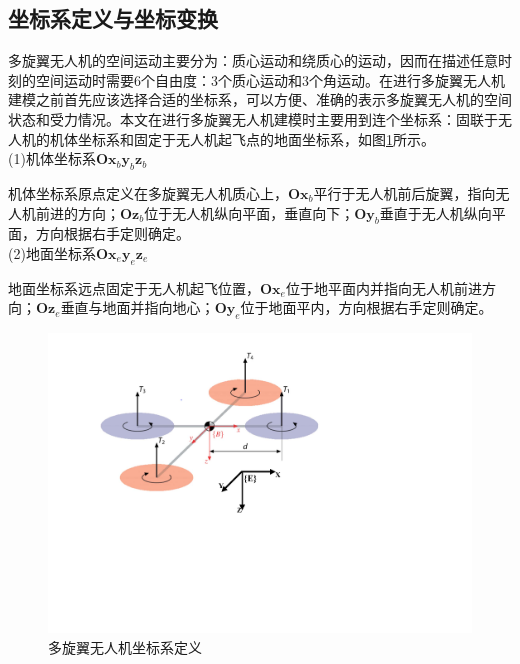 \subsection{坐标系定义与坐标变换}
多旋翼无人机的空间运动主要分为：质心运动和绕质心的运动，因而在描述任意时刻的空间运动时需要6个自由度：3个质心运动和3个角运动。在进行多旋翼无人机建模之前首先应该选择合适的坐标系，可以方便、准确的表示多旋翼无人机的空间状态和受力情况。本文在进行多旋翼无人机建模时主要用到连个坐标系：固联于无人机的机体坐标系和固定于无人机起飞点的地面坐标系，如图\ref{fig2.2}所示。\\
(1)机体坐标系$\boldsymbol{O} \boldsymbol{x}_b \boldsymbol{y}_b \boldsymbol{z}_b$

机体坐标系原点定义在多旋翼无人机质心上，$\boldsymbol{O} \boldsymbol{x}_b$平行于无人机前后旋翼，指向无人机前进的方向；$\boldsymbol{O} \boldsymbol{z}_b$位于无人机纵向平面，垂直向下；$\boldsymbol{O} \boldsymbol{y}_b$垂直于无人机纵向平面，方向根据右手定则确定。 \\ 
(2)地面坐标系$\boldsymbol{O} \boldsymbol{x}_e \boldsymbol{y}_e \boldsymbol{z}_e$

地面坐标系远点固定于无人机起飞位置，$\boldsymbol{O} \boldsymbol{x}_e$位于地平面内并指向无人机前进方向；$\boldsymbol{O} \boldsymbol{z}_e$垂直与地面并指向地心；$\boldsymbol{O} \boldsymbol{y}_e$位于地面平内，方向根据右手定则确定。

\begin{figure}[h]
\centering
\includegraphics[scale=0.7,angle=-90]{figures/Fig2-2.pdf}
\caption{多旋翼无人机坐标系定义}
\label{fig2.2}
\end{figure}

